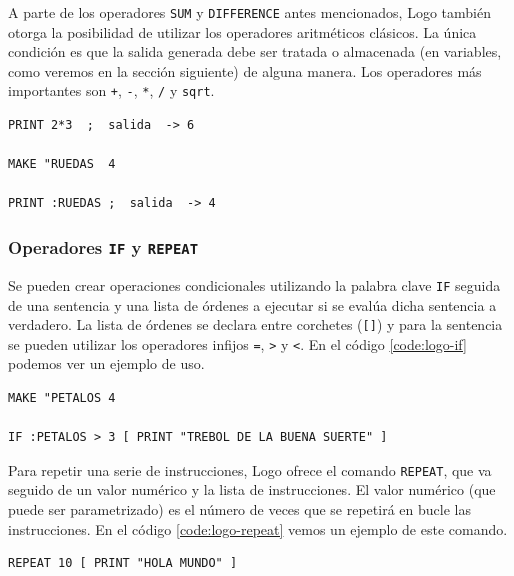 A parte de los operadores \texttt{SUM} y \texttt{DIFFERENCE} antes mencionados, Logo también otorga la posibilidad de utilizar los operadores aritméticos clásicos. La única condición es que la salida generada debe ser tratada o almacenada (en variables, como veremos en la sección siguiente) de alguna manera. Los operadores más importantes son \texttt{+}, \texttt{-}, \texttt{*}, \texttt{/} y \texttt{sqrt}.

\begin{lstlisting}[language={Logo}, label={code:logo-operadores-aritmeticos}, caption=Ejemplo de uso de operadores aritméticos en el lenguaje Logo.]
PRINT 2*3  ;  salida  -> 6

MAKE "RUEDAS  4

PRINT :RUEDAS ;  salida  -> 4
\end{lstlisting}


\subsubsection*{Operadores \texttt{IF} y \texttt{REPEAT}}

Se pueden crear operaciones condicionales utilizando la palabra clave \texttt{IF} seguida de una sentencia y una lista de órdenes a ejecutar si se evalúa dicha sentencia a verdadero. La lista de órdenes se declara entre corchetes (\texttt{[]}) y para la sentencia se pueden utilizar los operadores infijos \texttt{=}, \texttt{>} y \texttt{<}. En el código \ref{code:logo-if} podemos ver un ejemplo de uso.

\begin{lstlisting}[language=Logo,label={code:logo-if}, caption=Condiciones en el lenguaje logo con el operador \texttt{IF}.]
MAKE "PETALOS 4

IF :PETALOS > 3 [ PRINT "TREBOL DE LA BUENA SUERTE" ]
\end{lstlisting}

Para repetir una serie de instrucciones, Logo ofrece el comando \texttt{REPEAT}, que va seguido de un valor numérico y la lista de instrucciones. El valor numérico (que puede ser parametrizado) es el número de veces que se repetirá en bucle las instrucciones. En el código \ref{code:logo-repeat} vemos un ejemplo de este comando.


\begin{lstlisting}[language=Logo,label={code:logo-repeat}, caption=Condiciones en el lenguaje logo con el operador \texttt{IF}.]
REPEAT 10 [ PRINT "HOLA MUNDO" ]
\end{lstlisting}


